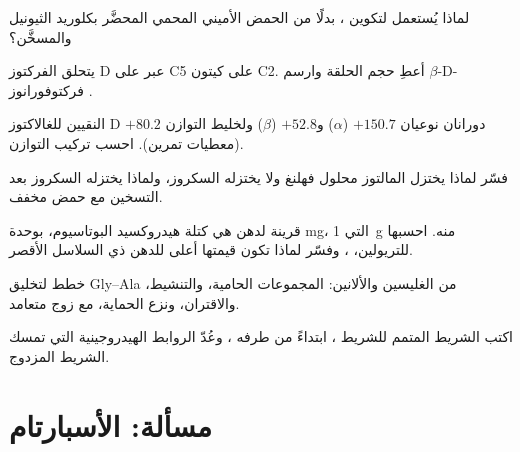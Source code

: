\begin{exercise}[$\star\star$]\label{exo:b2:biomolecules:6}
لماذا يُستعمل  لتكوين ، بدلًا من  الحمض الأميني
المحمي المحضَّر بكلوريد الثيونيل والمسخَّن؟
\end{exercise}

\begin{exercise}[$\star\star$]\label{exo:b2:biomolecules:7}
يتحلق الفركتوز D عبر  على C5 على كيتون C2. أعطِ حجم الحلقة وارسم
$\beta$-D-فركتوفورانوز .
\end{exercise}

\begin{exercise}[$\star\star$]\label{exo:b2:biomolecules:8}
 النقيين للغالاكتوز D دورانان نوعيان $+150.7$ ($\alpha$) و$+52.8$ ($\beta$) 
ولخليط التوازن $+80.2$ (معطيات تمرين). احسب تركيب التوازن.
\end{exercise}

\begin{exercise}[$\star\star$]\label{exo:b2:biomolecules:9}
فسّر لماذا يختزل المالتوز محلول فهلنغ ولا يختزله السكروز، ولماذا يختزله السكروز بعد
التسخين مع حمض مخفف.
\end{exercise}

\begin{exercise}[$\star\star\star$]\label{exo:b2:biomolecules:10}
قرينة  لدهن هي كتلة هيدروكسيد البوتاسيوم، بوحدة mg، التي  1~g منه.
احسبها للتريولين، ، وفسّر لماذا تكون قيمتها أعلى للدهن ذي السلاسل الأقصر.
\end{exercise}

\begin{exercise}[$\star\star\star$]\label{exo:b2:biomolecules:11}
خطط لتخليق Gly--Ala من الغليسين والألانين: المجموعات الحامية، والتنشيط، والاقتران،
ونزع الحماية، مع زوج متعامد.
\end{exercise}

\begin{exercise}[$\star\star\star$]\label{exo:b2:biomolecules:12}
اكتب الشريط المتمم للشريط ، ابتداءً من طرفه ، وعُدّ الروابط الهيدروجينية
التي تمسك الشريط المزدوج.
\end{exercise}

\section{مسألة: الأسبارتام}

